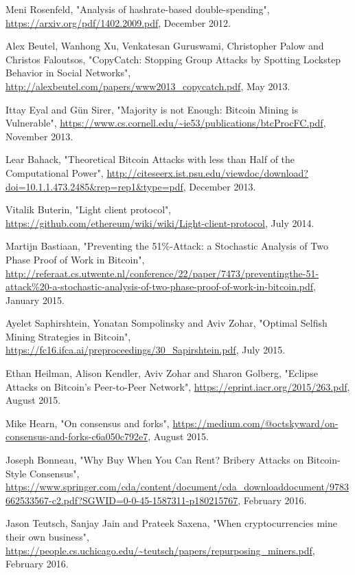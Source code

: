 \documentclass[12pt,a4paper]{article}
\begin{document}
\begin{thebibliography}{9}
Meni Rosenfeld,
"Analysis of hashrate-based double-spending",
\url{https://arxiv.org/pdf/1402.2009.pdf},
December 2012.

Alex Beutel, Wanhong Xu, Venkatesan Guruswami, Christopher Palow and Christos Faloutsos,
"CopyCatch: Stopping Group Attacks by Spotting Lockstep Behavior in Social Networks",
\url{http://alexbeutel.com/papers/www2013_copycatch.pdf},
May 2013.

Ittay Eyal and Gün Sirer,
"Majority is not Enough: Bitcoin Mining is Vulnerable",
\url{https://www.cs.cornell.edu/~ie53/publications/btcProcFC.pdf},
November 2013.

Lear Bahack,
"Theoretical Bitcoin Attacks with less than Half of the Computational Power",
\url{http://citeseerx.ist.psu.edu/viewdoc/download?doi=10.1.1.473.2485&rep=rep1&type=pdf},
December 2013.

Vitalik Buterin,
"Light client protocol",
\url{https://github.com/ethereum/wiki/wiki/Light-client-protocol},
July 2014.

Martijn Bastiaan,
"Preventing the 51\%-Attack: a Stochastic Analysis of Two Phase Proof of Work in Bitcoin",
\url{http://referaat.cs.utwente.nl/conference/22/paper/7473/preventingthe-51-attack%20-a-stochastic-analysis-of-two-phase-proof-of-work-in-bitcoin.pdf},
January 2015.

Ayelet Saphirshtein, Yonatan Sompolinsky and Aviv Zohar,
"Optimal Selfish Mining Strategies in Bitcoin",
\url{https://fc16.ifca.ai/preproceedings/30_Sapirshtein.pdf},
July 2015.

Ethan Heilman, Alison Kendler, Aviv Zohar and Sharon Golberg,
"Eclipse Attacks on Bitcoin’s Peer-to-Peer Network",
\url{https://eprint.iacr.org/2015/263.pdf},
August 2015.

Mike Hearn,
"On consensus and forks",
\url{https://medium.com/@octskyward/on-consensus-and-forks-c6a050c792e7},
August 2015.

Joseph Bonneau,
"Why Buy When You Can Rent? Bribery Attacks on Bitcoin-Style Consensus",
\url{https://www.springer.com/cda/content/document/cda_downloaddocument/9783662533567-c2.pdf?SGWID=0-0-45-1587311-p180215767},
February 2016.

Jason Teutsch, Sanjay Jain and Prateek Saxena,
"When cryptocurrencies mine their own business",
\url{https://people.cs.uchicago.edu/~teutsch/papers/repurposing_miners.pdf},
February 2016.


\end{thebibliography}
\end{document}
